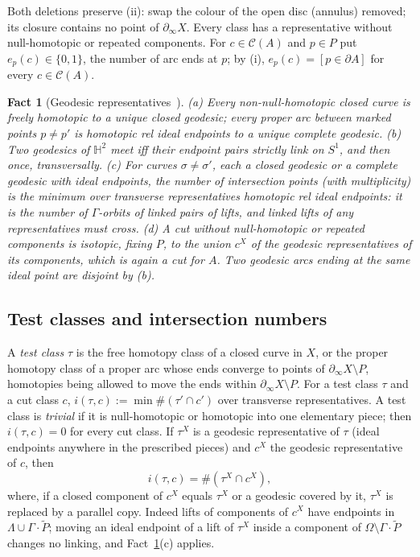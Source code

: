 \documentclass[aps,prd,onecolumn,superscriptaddress,nofootinbib,amsmath,amssymb,11pt]{revtex4-2}
\newtheorem{fact}[theorem]{Fact}
\theoremstyle{definition}
\newcommand{\Hyp}{\mathbb{H}^2}
\newcommand{\Cut}{\mathcal{C}}
\newcommand{\Pt}{\tilde P}
\begin{document}
Both deletions preserve (ii): swap the colour of the open disc (annulus) removed; its closure contains no
point of $\partial_\infty X$. Every class has a representative without null-homotopic or repeated
components. For $c\in\Cut(A)$ and $p\in P$ put $e_p(c)\in\{0,1\}$, the number of arc ends at $p$; by (i),
$e_p(c)=[p\in\partial A]$ for every $c\in\Cut(A)$.

\begin{fact}[Geodesic representatives~\cite{Epstein1966,FarbMargalit2012}]\label{fact:geod}
(a) Every non-null-homotopic closed curve is freely homotopic to a unique closed geodesic; every proper arc
between marked points $p\neq p'$ is homotopic rel ideal endpoints to a unique complete geodesic.
(b) Two geodesics of $\Hyp$ meet iff their endpoint pairs strictly link on $S^1$, and then once, transversally.
(c) For curves $\sigma\neq\sigma'$, each a closed geodesic or a complete geodesic with ideal endpoints, the
number of intersection points (with multiplicity) is the minimum over transverse representatives homotopic rel
ideal endpoints: it is the number of $\Gamma$-orbits of linked pairs of lifts, and linked lifts of any
representatives must cross.
(d) A cut without null-homotopic or repeated components is isotopic, fixing $P$, to the union $c^X$ of the
geodesic representatives of its components, which is again a cut for $A$. Two geodesic arcs ending at the same
ideal point are disjoint by (b).
\end{fact}

\subsection{Test classes and intersection numbers}

A \emph{test class} $\tau$ is the free homotopy class of a closed curve in $X$, or the proper homotopy class of a
proper arc whose ends converge to points of $\partial_\infty X\setminus P$, homotopies being allowed to move the
ends within $\partial_\infty X\setminus P$. For a test class $\tau$ and a cut class $c$,
$i(\tau,c):=\min\#(\tau'\cap c')$ over transverse representatives. A test class is \emph{trivial} if it is
null-homotopic or homotopic into one elementary piece; then $i(\tau,c)=0$ for every cut class. If $\tau^X$ is a
geodesic representative of $\tau$ (ideal endpoints anywhere in the prescribed pieces) and $c^X$ the geodesic
representative of $c$, then
\begin{equation}\label{eq:B0pre}
i(\tau,c)=\#(\tau^X\cap c^X),
\end{equation}
where, if a closed component of $c^X$ equals $\tau^X$ or a geodesic covered by it, $\tau^X$ is replaced by a
parallel copy. Indeed lifts of components of $c^X$ have endpoints in $\Lambda\cup\Gamma\cdot\Pt$; moving an ideal
endpoint of a lift of $\tau^X$ inside a component of $\Omega\setminus\Gamma\cdot\Pt$ changes no linking, and
Fact~\ref{fact:geod}(c) applies.
\end{document}
